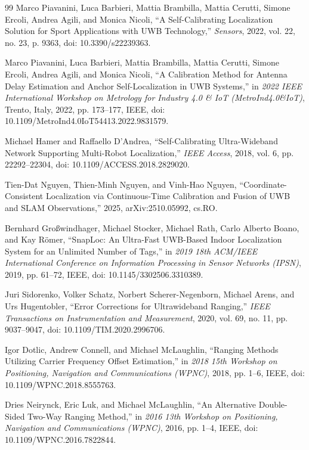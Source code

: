 \begin{thebibliography}{99}
Marco Piavanini, Luca Barbieri, Mattia Brambilla, Mattia Cerutti, Simone Ercoli, Andrea Agili, and Monica Nicoli, ``A Self-Calibrating Localization Solution for Sport Applications with UWB Technology,'' \emph{Sensors}, 2022, vol. 22, no. 23, p. 9363, doi: 10.3390/s22239363.

Marco Piavanini, Luca Barbieri, Mattia Brambilla, Mattia Cerutti, Simone Ercoli, Andrea Agili, and Monica Nicoli, ``A Calibration Method for Antenna Delay Estimation and Anchor Self-Localization in UWB Systems,'' in \emph{2022 IEEE International Workshop on Metrology for Industry 4.0 \& IoT (MetroInd4.0\&IoT)}, Trento, Italy, 2022, pp. 173--177, IEEE, doi: 10.1109/MetroInd4.0IoT54413.2022.9831579.

Michael Hamer and Raffaello D'Andrea, ``Self-Calibrating Ultra-Wideband Network Supporting Multi-Robot Localization,'' \emph{IEEE Access}, 2018, vol. 6, pp. 22292--22304, doi: 10.1109/ACCESS.2018.2829020.

Tien-Dat Nguyen, Thien-Minh Nguyen, and Vinh-Hao Nguyen, ``Coordinate-Consistent Localization via Continuous-Time Calibration and Fusion of UWB and SLAM Observations,'' 2025, arXiv:2510.05992, cs.RO.

Bernhard Gro{\ss}windhager, Michael Stocker, Michael Rath, Carlo Alberto Boano, and Kay R{\"o}mer, ``SnapLoc: An Ultra-Fast UWB-Based Indoor Localization System for an Unlimited Number of Tags,'' in \emph{2019 18th ACM/IEEE International Conference on Information Processing in Sensor Networks (IPSN)}, 2019, pp. 61--72, IEEE, doi: 10.1145/3302506.3310389.

Juri Sidorenko, Volker Schatz, Norbert Scherer-Negenborn, Michael Arens, and Urs Hugentobler, ``Error Corrections for Ultrawideband Ranging,'' \emph{IEEE Transactions on Instrumentation and Measurement}, 2020, vol. 69, no. 11, pp. 9037--9047, doi: 10.1109/TIM.2020.2996706.

Igor Dotlic, Andrew Connell, and Michael McLaughlin, ``Ranging Methods Utilizing Carrier Frequency Offset Estimation,'' in \emph{2018 15th Workshop on Positioning, Navigation and Communications (WPNC)}, 2018, pp. 1--6, IEEE, doi: 10.1109/WPNC.2018.8555763.

Dries Neirynck, Eric Luk, and Michael McLaughlin, ``An Alternative Double-Sided Two-Way Ranging Method,'' in \emph{2016 13th Workshop on Positioning, Navigation and Communications (WPNC)}, 2016, pp. 1--4, IEEE, doi: 10.1109/WPNC.2016.7822844.


\end{thebibliography}
